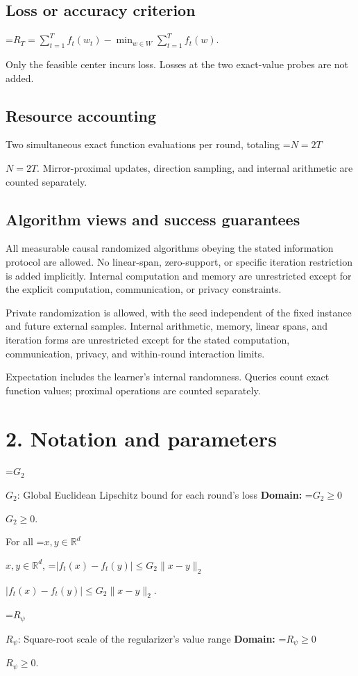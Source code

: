 \documentclass[10pt,a4paper]{article}
\newcommand{\AtlasMath}[1]{\par\begingroup\centering\setbox0=\hbox{$\displaystyle #1$}\ifdim\wd0>1.4\linewidth\typeout{ATLAS WIDE FORMULA: \the\wd0}\fi\ifdim\wd0>\linewidth\resizebox{\linewidth}{!}{\box0}\else\box0\fi\par\endgroup}
\newcommand{\AtlasInlineMath}[1]{\begingroup\setbox0=\hbox{$#1$}\ifdim\wd0>.4\linewidth\endgroup\AtlasMath{#1}\else\endgroup$#1$\fi}
\begin{document}
\subsection{Loss or accuracy criterion}

\AtlasMath{R_T=\sum_{t=1}^T f_t(w_t)-\min_{w\in W}\sum_{t=1}^T f_t(w).}


Only the feasible center incurs loss. Losses at the two exact-value probes are not added.

\subsection{Resource accounting}
Two simultaneous exact function evaluations per round, totaling \AtlasInlineMath{N=2T}. Mirror-proximal updates, direction sampling, and internal arithmetic are counted separately.

\subsection{Algorithm views and success guarantees}
All measurable causal randomized algorithms obeying the stated information protocol are allowed. No linear-span, zero-support, or specific iteration restriction is added implicitly. Internal computation and memory are unrestricted except for the explicit computation, communication, or privacy constraints.

Private randomization is allowed, with the seed independent of the fixed instance and future external samples. Internal arithmetic, memory, linear spans, and iteration forms are unrestricted except for the stated computation, communication, privacy, and within-round interaction limits.

Expectation includes the learner's internal randomness. Queries count exact function values; proximal operations are counted separately.

\section{2. Notation and parameters}
\AtlasInlineMath{G_2}: Global Euclidean Lipschitz bound for each round's loss \textbf{Domain:} \AtlasInlineMath{G_2\ge0}.

For all \AtlasInlineMath{x,y\in\mathbb R^d}, \AtlasInlineMath{|f_t(x)-f_t(y)|\le G_2\|x-y\|_2}.

\AtlasInlineMath{R_\psi}: Square-root scale of the regularizer's value range \textbf{Domain:} \AtlasInlineMath{R_\psi\ge0}.
\end{document}
